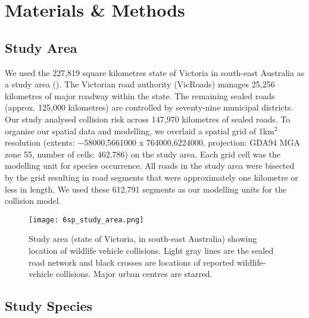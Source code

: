 \section{Materials \& Methods}

\subsection{Study Area}

We used the 227,819 square kilometres state of Victoria in south-east Australia as a study area (). The Victorian road authority (VicRoads) manages 25,256 kilometres of major roadway within the state. The remaining sealed roads (approx. 125,000 kilometres) are controlled by seventy-nine municipal districts. Our study analysed collision risk across 147,970 kilometres of sealed roads. To organise our spatial data and modelling, we overlaid a spatial grid of 1km$^2$ resolution (extents: $-$58000,5661000 x 764000,6224000, projection: GDA94 MGA zone 55, number of cells: 462,786) on the study area. Each grid cell was the modelling unit for species occurrence. All roads in the study area were bisected by the grid resulting in road segments that were approximately one kilometre or less in length. We used these 612,791 segments as our modelling units for the collision model.

\begin{figure*}[!t]
  \centering
  \texttt{[image: 6sp\_study\_area.png]}
  \caption[Wildlife-vehicle collisions in Victoria]{Study area (state of Victoria, in south-east Australia) showing location of wildlife vehicle collisions. Light gray lines are the sealed road network and black crosses are locations of reported wildlife-vehicle collisions. Major urban centres are starred.}
  \label{6sp_study_area}
\end{figure*}

\subsection{Study Species}

